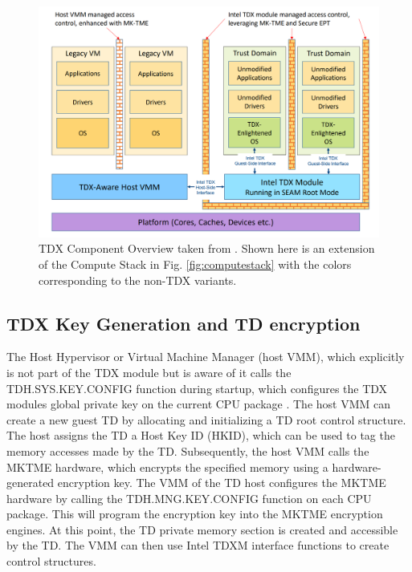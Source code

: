 \begin{figure}
\centering
\includegraphics[width=\textwidth]{figures/TDX-Component-Overview}
\caption{TDX Component Overview taken from \cite[p.~19]{noauthor_tdx-module-10-public-specpdf_nodate}. Shown here is an extension of the Compute Stack in Fig. \ref{fig:computestack} with the colors corresponding to the non-TDX variants.}
\label{fig:component-overview}
\end{figure}
\subsection{TDX Key Generation and TD encryption}
The Host Hypervisor or Virtual Machine Manager (host VMM), which explicitly is not part of the TDX module but is aware of it calls the TDH.SYS.KEY.CONFIG function during startup, which configures the TDX modules global private key on the current CPU package \cite{intel_corporation_intel-tdx-module-15-abi-spec-348551001pdf_2024}.  The host VMM can create a new guest TD by allocating and initializing a TD root control structure. The host assigns the TD a Host Key ID (HKID), which can be used to tag the memory accesses made by the TD\cite{noauthor_tdx-module-10-public-specpdf_nodate}. Subsequently, the host VMM calls the MKTME hardware, which encrypts the specified memory using a hardware-generated encryption key\cite{noauthor_multi-key-total-memory-encryption-spec-14pdf_nodate}. The VMM of the TD host configures the MKTME hardware by calling the TDH.MNG.KEY.CONFIG function on each CPU package. This will program the encryption key into the MKTME encryption engines\cite{noauthor_tdx-module-10-public-specpdf_nodate}. At this point, the TD private memory section is created and accessible by the TD. The VMM can then use Intel TDXM interface functions to create control structures. 
